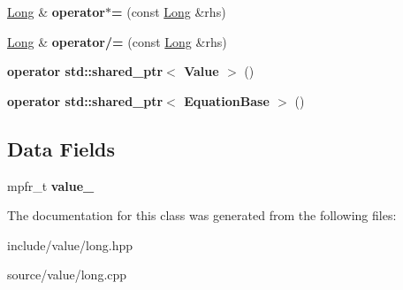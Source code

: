 \begin{DoxyCompactItemize}
\mbox{\label{classradix_1_1Long_a8d320bc31548b5d44272e8cf04464c62}} 
\hyperlink{classradix_1_1Long}{Long} \& {\bfseries operator$\ast$=} (const \hyperlink{classradix_1_1Long}{Long} \&rhs)
\item 
\mbox{\label{classradix_1_1Long_a386f2a61d8a37797160bcb9868af9ffe}} 
\hyperlink{classradix_1_1Long}{Long} \& {\bfseries operator/=} (const \hyperlink{classradix_1_1Long}{Long} \&rhs)
\item 
\mbox{\label{classradix_1_1Long_a227a6f77719c6f7a5c45c0c38a782f2e}} 
{\bfseries operator std\+::shared\+\_\+ptr$<$ Value $>$} ()
\item 
\mbox{\label{classradix_1_1Long_a6ee622b45931bffaf8729e1d8b9c344a}} 
{\bfseries operator std\+::shared\+\_\+ptr$<$ Equation\+Base $>$} ()
\end{DoxyCompactItemize}
\subsection*{Data Fields}
\begin{DoxyCompactItemize}
\item 
\mbox{\label{classradix_1_1Long_a5c1262411dd23a7b9c0e6b8e064b7f58}} 
mpfr\+\_\+t {\bfseries value\+\_\+}
\end{DoxyCompactItemize}


The documentation for this class was generated from the following files\+:\begin{DoxyCompactItemize}
\item 
include/value/long.\+hpp\item 
source/value/long.\+cpp\end{DoxyCompactItemize}
